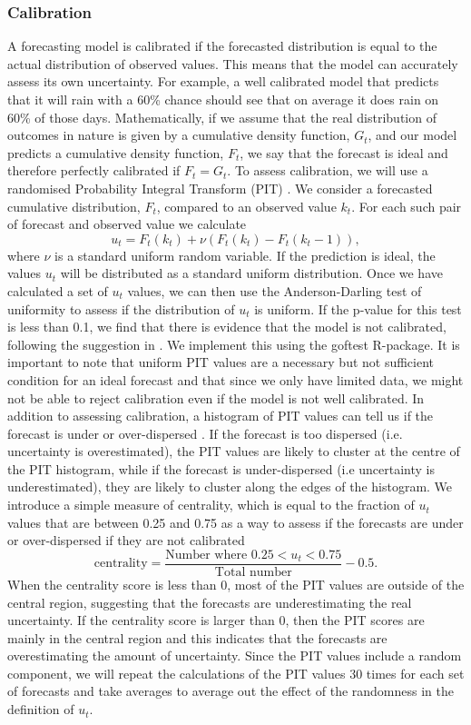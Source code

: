\documentclass[12pt]{article}
\begin{document}
\subsubsection{Calibration}
A forecasting model is calibrated if the forecasted distribution is equal to the actual distribution of observed values. This means that the model can accurately assess its own uncertainty. For example, a well calibrated model that predicts that it will rain with a 60\% chance should see that on average it does rain on 60\% of those days. Mathematically, if we assume that the real distribution of outcomes in nature is given by a cumulative density function, $G_t$, and our model predicts a cumulative density function, $F_t$, we say that the forecast is ideal and therefore perfectly calibrated if $F_t=G_t$. To assess calibration, we will use a randomised Probability Integral Transform (PIT) \cite{czadoPredictiveModelAssessment2009a}. We consider a forecasted cumulative distribution, $F_t$, compared to an observed value $k_t$. For each such pair of forecast and observed value we calculate
\[ u_t = F_t(k_t) + \nu (F_t(k_t) - F_t(k_t -1)),\]
where $\nu$ is a standard uniform random variable. If the prediction is ideal, the values $u_t$ will be distributed as a standard uniform distribution. Once we have calculated a set of $u_t$ values, we can then use the Anderson-Darling test of uniformity to assess if the distribution of $u_t$ is uniform. If the p-value for this test is less than 0.1, we find that there is evidence that the model is not calibrated, following the suggestion in \cite{funkAssessingPerformanceRealtime2019}. We implement this using the goftest \cite{farawayGoftestClassicalGoodnessofFit2017} R-package. It is important to note that uniform PIT values are a necessary but not sufficient condition for an ideal forecast and that since we only have limited data, we might not be able to reject calibration even if the model is not well calibrated. In addition to assessing calibration, a histogram of PIT values can tell us if the forecast is under or over-dispersed \cite{czadoPredictiveModelAssessment2009a}. If the forecast is too dispersed (i.e. uncertainty is overestimated), the PIT values are likely to cluster at the centre of the PIT histogram, while if the forecast is under-dispersed (i.e uncertainty is underestimated), they are likely to cluster along the edges of the histogram. We introduce a simple measure of centrality, which is equal to the fraction of $u_t$ values that are between 0.25 and 0.75 as a way to assess if the forecasts are under or over-dispersed if they are not calibrated
\[\text{centrality} = \frac{\text{Number where }0.25 < u_t < 0.75}{\text{Total number}} - 0.5.\]
When the centrality score is less than 0, most of the PIT values are outside of the central region, suggesting that the forecasts are underestimating the real uncertainty.  If the centrality score is larger than 0, then the PIT scores are mainly in the central region and this indicates that the forecasts are overestimating the amount of uncertainty. Since the PIT values include a random component, we will  repeat the calculations of the PIT values 30 times for each set of forecasts and take averages to average out the effect of the randomness in the definition of $u_t$.
\end{document}
